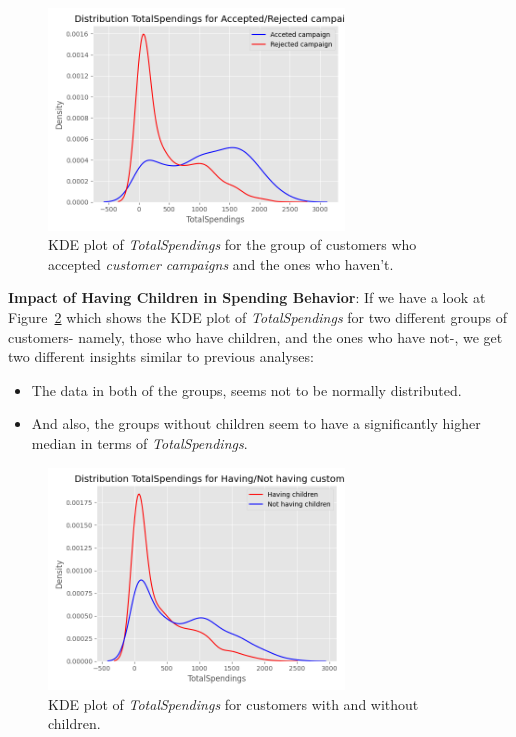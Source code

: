 \documentclass[a4paper,12pt]{article}
\begin{document}
\begin{figure}[H]
    \centering
    \includegraphics[width=0.7\textwidth]{./images/distro_totalspending_for_accept_reject_campaign.png}
    \caption{KDE plot of \textit{TotalSpendings} for the group of customers who accepted \textit{customer campaigns} and the ones who haven't.}
    \label{fig:Figure_3}
\end{figure}


\noindent \textbf{Impact of Having Children in Spending Behavior}: If we have a look at Figure~\ref{fig:Figure_4} which shows the KDE plot of \textit{TotalSpendings} for two different groups of customers- namely, 
those who have children, and the ones who have not-, we get two different insights similar to previous analyses:
\begin{itemize}
    \item The data in both of the groups, seems not to be normally distributed.
    \item And also, the groups without children seem to have a significantly higher median in terms of \textit{TotalSpendings}.
\end{itemize}
 
\begin{figure}[H]
    \centering
    \includegraphics[width=0.7\textwidth]{./images/distro_totalspending_for_having_not_having_customers.png}
    \caption{KDE plot of \textit{TotalSpendings} for customers with and without children.}
    \label{fig:Figure_4}
\end{figure}
\end{document}
